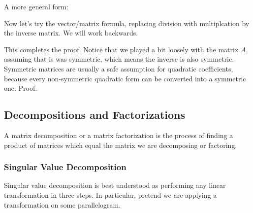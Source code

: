 \documentclass[12pt]{article}
\begin{document}
A more general form:

Now let's try the vector/matrix formula, replacing division with multiplcation by the inverse matrix. We will work backwards.


This completes the proof. Notice that we played a bit loosely with the matrix $A$, assuming that is was symmetric, which means the inverse is also symmetric. Symmetric matrices are usually a safe assumption for quadratic coefficients, because every non-symmetric quadratic form can be converted into a symmetric one. Proof.


\subsection{Decompositions and Factorizations}

A matrix decomposition or a matrix factorization is the process of finding a product of matrices which equal the matrix we are decomposing or factoring.

\subsubsection{Singular Value Decomposition}


Singular value decomposition is best understood as performing any linear transformation in three steps. In particular, pretend we are applying a transformation on some parallelogram.

\end{document}
